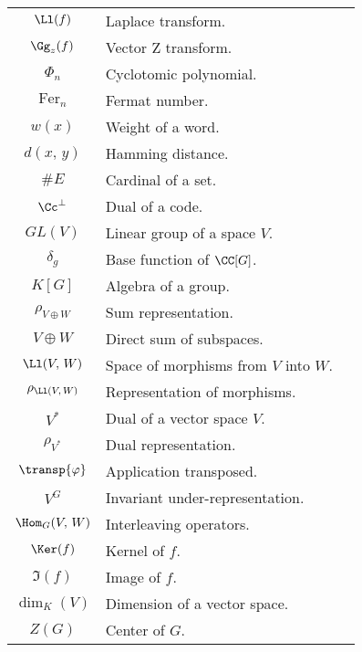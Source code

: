 \begin{center}
\begin{supertabular}{| c | p{9cm} | c |}
$ \Ll (f) $ & Laplace transform. & \pageref{notation-62} \\[1mm]
$ \Gg_z (f) $ & Vector Z transform. & \pageref{notation-63} \\[1mm]
$ \Phi_n $ & Cyclotomic polynomial. & \pageref{notation-64} \\[1mm]
$ \text{Fer}_n $ &  Fermat number. & \pageref{notation-65} \\[1mm]
$ w (x) $ & Weight of a word. & \pageref{notation-66} \\[1mm]
$ d (x, \, y) $ & Hamming distance. & \pageref{notation-67} \\[1mm]
$ \# E $ & Cardinal of a set. & \pageref{notation-68} \\[1mm]
$ \Cc^\bot $ & Dual of a code. & \pageref{notation-69} \\[1mm]
$ GL (V) $ & Linear group of a space $ V $. & \pageref{notation-70} \\[1mm]
$ \delta_g $ & Base function of $ \CC [G] $. & \pageref{notation-71} \\[1mm]
$ K [G] $ & Algebra of a group. & \pageref{notation-72} \\[1mm]
$ \rho_{V \oplus W} $ & Sum representation. & \pageref{notation-73} \\[1mm]
$ V \oplus W $ & Direct sum of subspaces. & \pageref{notation-74} \\[1mm]
$ \Ll (V, \, W) $ & Space of morphisms from $ V $ into $ W $. & \pageref{notation-75} \\[1mm]
$ \rho_{\Ll (V, \, W)} $ & Representation of morphisms. & \pageref{notation-76} \\[1mm]
$ V^* $ & Dual of a vector space $ V $. & \pageref{notation-77} \\[1mm]
$ \rho_{V^*} $ & Dual representation. & \pageref{notation-78} \\[1mm]
$ \transp{\varphi} $ & Application transposed. & \pageref{notation-79} \\[1mm]
$ V^G $ & Invariant under-representation. & \pageref{notation-80} \\[1mm]
$ \Hom_G (V, \, W) $ & Interleaving operators. & \pageref{notation-81} \\[1mm]
$ \Ker (f) $ & Kernel of $ f $. & \pageref{notation-82} \\[1mm]
$ \Im (f) $ & Image of $ f $. & \pageref{notation-83} \\[1mm]
$ \dim_{K} (V) $ & Dimension of a vector space. & \pageref{notation-84} \\[1mm]
$ Z (G) $ & Center of $ G $. & \pageref{notation-85} \\[1mm]

\end{supertabular}
\end{center}
